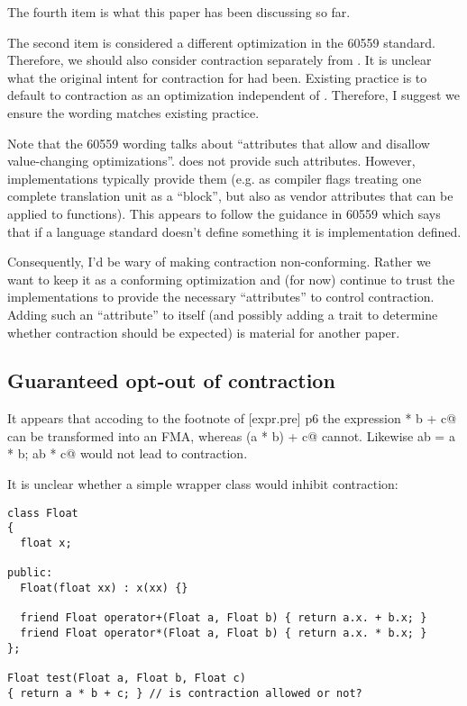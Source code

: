 The fourth item is what this paper has been discussing so far.

The second item is considered a different optimization in the 60559 standard.
Therefore, we should also consider \fp contraction separately from
.
It is unclear what the original intent for \fp contraction for \CC{} had been.
Existing practice is to default to \fp contraction as an optimization
independent of .
Therefore, I suggest we ensure the wording matches existing practice.

Note that the 60559 wording talks about “attributes that allow and disallow
value-changing optimizations”.
\CC{} does not provide such attributes.
However, implementations typically provide them (e.g. as compiler flags
treating one complete translation unit as a “block”, but also as vendor
attributes that can be applied to functions).
This appears to follow the guidance in 60559 which says that if a language
standard doesn't define something it is implementation defined.

Consequently, I'd be wary of making \fp contraction non-conforming.
Rather we want to keep it as a conforming optimization and (for now) continue
to trust the implementations to provide the necessary “attributes” to control
\fp contraction.
Adding such an “attribute” to \CC{} itself (and possibly adding a trait to
determine whether \fp contraction should be expected) is material for another
paper.

\subsection{Guaranteed opt-out of \fp contraction}

It appears that accoding to the footnote of [expr.pre] p6 the expression
\lstinline@a * b + c@ can be transformed into an FMA, whereas
\lstinline@auto(a * b) + c@ cannot.
Likewise \lstinline@auto ab = a * b; ab * c@ would not lead to \fp contraction.

It is unclear whether a simple \fp wrapper class would inhibit \fp contraction:
\medskip
\begin{lstlisting}
class Float
{
  float x;

public:
  Float(float xx) : x(xx) {}

  friend Float operator+(Float a, Float b) { return a.x. + b.x; }
  friend Float operator*(Float a, Float b) { return a.x. * b.x; }
};

Float test(Float a, Float b, Float c)
{ return a * b + c; } // is contraction allowed or not?
\end{lstlisting}

